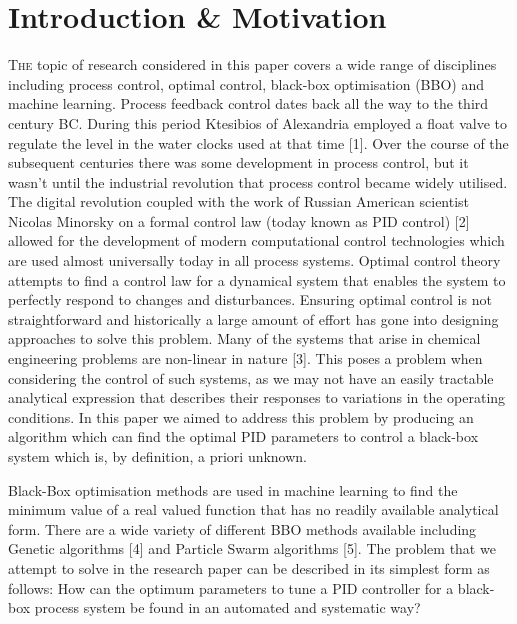 \documentclass[conference]{IEEEtran}
\theoremstyle{definition}
\begin{document}
\section{Introduction \& Motivation}
\lettrine{T}{he} topic of research considered in this paper covers a wide range of disciplines including process control, optimal control, black-box optimisation (BBO) and machine learning. Process feedback control dates back all the way to the third century BC. During this period Ktesibios of Alexandria employed a float valve to regulate the level in the water clocks used at that time [1]. Over the course of the subsequent centuries there was some development in process control, but it wasn’t until the industrial revolution that process control became widely utilised. The digital revolution coupled with the work of Russian American scientist Nicolas Minorsky on a formal control law (today known as PID control) [2] allowed for the development of modern computational control technologies which are used almost universally today in all process systems. Optimal control theory attempts to find a control law for a dynamical system that enables the system to perfectly respond to changes and disturbances. Ensuring optimal control is not straightforward and historically a large amount of effort has gone into designing approaches to solve this problem. Many of the systems that arise in chemical engineering problems are non-linear in nature [3]. This poses a problem when considering the control of such systems, as we may not have an easily tractable analytical expression that describes their responses to variations in the operating conditions. In this paper we aimed to address this problem by producing an algorithm which can find the optimal PID parameters to control a black-box system which is, by definition, a priori unknown. 

\noindent Black-Box optimisation methods are used in machine learning to find the minimum value of a real valued function that has no readily available analytical form. There are a wide variety of different BBO methods available including Genetic algorithms [4] and Particle Swarm algorithms [5]. The problem that we attempt to solve in the research paper can be described in its simplest form as follows: How can the optimum parameters to tune a PID controller for a black-box process system be found in an automated and systematic way? 
\end{document}
